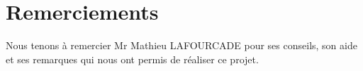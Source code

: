 \documentclass[12pt,a4paper]{report}
\begin{document}



\section*{Remerciements}

Nous tenons à remercier Mr Mathieu LAFOURCADE pour ses conseils, son aide et ses remarques qui nous ont permis de réaliser ce projet. 

\newpage

\tableofcontents
\listoffigures

\newpage






\end{document}
